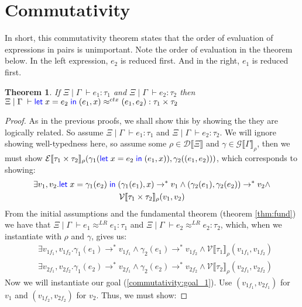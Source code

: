 \documentclass[a4paper, 11pt]{report}
\newtheorem{theorem}{Theorem}
\theoremstyle{definition}
\newcommand{\var}{x}
\newcommand{\expr}{e}
\newcommand{\val}{v}
\newcommand{\Tprod}[2]{#1 \times #2}
\newcommand{\typ}{\tau}
\newcommand{\venv}{\Gamma}
\newcommand{\tenv}{\Xi}
\newcommand{\jdg}[4]{#1 \; | \; #2 \; \vdash #3 : #4}
\newcommand{\jdgRel}[6]{#1 \; | \; #2 \; \vdash #3 \approx^{#4} #5 : #6}
\newcommand{\ctxRel}[5]{\jdgRel{#1}{#2}{#3}{ctx}{#4}{#5}}
\newcommand{\stepS}{\rightarrow^*}
\newcommand{\ValInp}[2]{\mathcal{V} \llbracket #1 \rrbracket_{#2}}
\newcommand{\ValInpGen}[2]{\ValInp{#1}{#2}(\val_1, \val_2)}
\newcommand{\ExpInp}[2]{\mathcal{E} \llbracket #1 \rrbracket_{#2}}
\newcommand{\VenvInp}[2]{\mathcal{G} \llbracket #1 \rrbracket_{#2}}
\newcommand{\TenvInp}[1]{\mathcal{D} \llbracket #1 \rrbracket}
\newcommand{\LogRel}[5]{\jdgRel{#1}{#2}{#3}{LR}{#4}{#5}}
\begin{document}
\section{Commutativity}
In short, this commutativity theorem states that the order of evaluation of expressions in pairs is unimportant. Note the order of evaluation in the theorem below. In the left expression, $\expr_2$ is reduced first. And in the right, $\expr_1$ is reduced first.
\begin{theorem}
  If $\jdg{\tenv}{\venv}{\expr_1}{\typ_1}$ and $\jdg{\tenv}{\venv}{\expr_2}{\typ_2}$ then\\
  $\ctxRel{\tenv}{\venv}{\Let \var = \expr_2 in (\expr_1, \var)}{(\expr_1, \expr_2)}{\Tprod{\typ_1}{\typ_2}}$
\end{theorem}
\begin{proof}
  As in the previous proofs, we shall show this by showing the they are logically related. So assume $\jdg{\tenv}{\venv}{\expr_1}{\typ_1}$ and $\jdg{\tenv}{\venv}{\expr_2}{\typ_2}$. We will ignore showing well-typedness here, so assume some $\rho \in \TenvInp{\tenv}$ and $\gamma \in \VenvInp{\venv}{\rho}$, then we must show $\ExpInp{\Tprod{\typ_1}{\typ_2}}{\rho}(\gamma_1(\Let \var = \expr_2 in (\expr_1, \var)), \gamma_2((\expr_1, \expr_2)))$, which corresponds to showing:
  \begin{multline}\label{commutativity:goal_1}
    \exists \val_1, \val_2 . \Let \var = \gamma_1(\expr_2) in (\gamma_1(\expr_1), \var) \stepS \val_1 \land (\gamma_2(\expr_1), \gamma_2(\expr_2)) \stepS \val_2 \land\\ \ValInpGen{\Tprod{\typ_1}{\typ_2}}{\rho}
  \end{multline}
  From the initial assumptions and the fundamental theorem (theorem \ref{thm:fund}) we have that $\LogRel{\tenv}{\venv}{\expr_1}{\expr_1}{\typ_1}$ and $\LogRel{\tenv}{\venv}{\expr_2}{\expr_2}{\typ_2}$, which, when we instantiate with $\rho$ and $\gamma$, gives us:
  \begin{align}
    &\exists \val_{1f_1}, \val_{1f_2} . \gamma_1(\expr_1) \stepS \val_{1f_1} \land \gamma_2(\expr_1) \stepS \val_{1f_2} \land \ValInp{\typ_1}{\rho}(\val_{1f_1}, \val_{1f_2})\label{commutativity:1.1}\\
    &\exists \val_{2f_1}, \val_{2f_2} . \gamma_1(\expr_2) \stepS \val_{2f_1} \land \gamma_2(\expr_2) \stepS \val_{2f_2} \land \ValInp{\typ_2}{\rho}(\val_{2f_1}, \val_{2f_2})\label{commutativity:1.2}
  \end{align}
  Now we will instantiate our goal (\ref*{commutativity:goal_1}). Use $(\val_{1f_1}, \val_{2f_1})$ for $\val_1$ and $(\val_{1f_2}, \val_{2f_2})$ for $\val_2$. Thus, we must show:

\end{proof}
\end{document}
